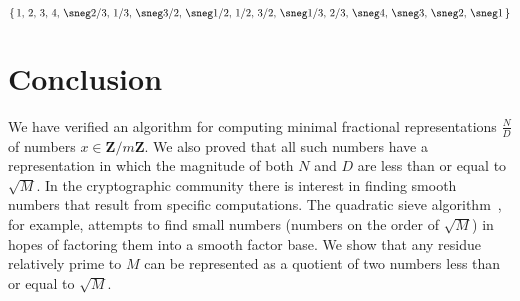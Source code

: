 \documentclass[submission,copyright,creativecommons]{eptcs}
\begin{document}
\[
\{
\,1,\,2,\,3,\,4,\,\sneg2/3,\,1/3,\,\sneg3/2,\,\sneg1/2,\,1/2,\,3/2,\,\sneg1/3,\,2/3,\,\sneg4,\,\sneg3,\,\sneg2,\,\sneg1\,
\}
\]

\section{Conclusion}

We have verified an algorithm for computing minimal fractional
representations $\frac{N}{D}$ of numbers $x \in
\mathbf{Z}/m\mathbf{Z}$.  We also proved that all such numbers have a
representation in which the magnitude of both $N$ and $D$ are
less than or equal to $\sqrt{M}$.  In the cryptographic community
there is interest in finding smooth numbers that result from specific
computations.  The quadratic sieve algorithm~\cite{Sieve}, for
example, attempts to find small numbers (numbers on the order of
$\sqrt{M}$) in hopes of factoring them into a smooth factor base.  We
show that any residue relatively prime to $M$ can be represented as a
quotient of two numbers less than or equal to $\sqrt{M}$.

{}

\end{document}
